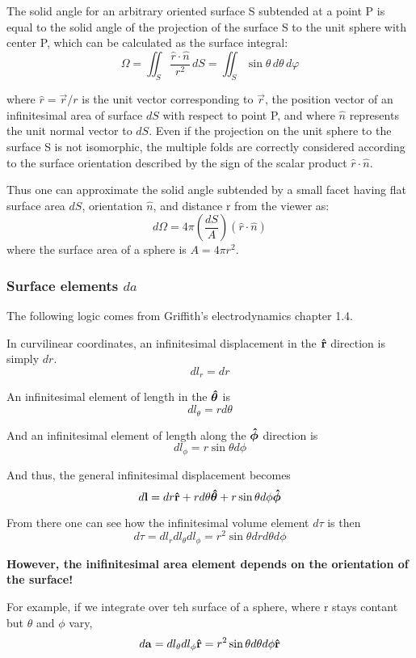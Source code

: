 The solid angle for an arbitrary oriented surface S subtended at a point P is equal to
the solid angle of the projection of the surface S to the unit sphere with center P,
which can be calculated as the surface integral:
$$
\Omega =\iint _{S} \frac{\hat{r}\cdot\hat{n}}{r^2} \,dS
= \iint_{S} \sin \theta \,d\theta \,d\varphi
$$

where $\hat{r} = \vec{r}/r$ is the unit vector corresponding to $\vec {r}$,
the position vector of an infinitesimal area of surface $dS$ with respect to point P,
and where $\hat{n}$ represents the unit normal vector to $dS$.
Even if the projection on the unit sphere to the surface S is not isomorphic,
the multiple folds are correctly considered according to the surface orientation
described by the sign of the scalar product $\hat{r}\cdot\hat{n}$.

Thus one can approximate the solid angle subtended by a small facet having flat surface area
$dS$, orientation $\hat{n}$, and distance r from the viewer as:
$$
d\Omega = 4\pi \left( \frac{dS}{A} \right) (\hat{r}\cdot\hat{n})
$$
where the surface area of a sphere is $A = 4\pi r^2$.


\subsubsection{Surface elements $da$}

The following logic comes from Griffith's electrodynamics chapter 1.4.

In curvilinear coordinates, an infinitesimal displacement in the $\boldsymbol{\mathbf{\hat{r}}}$ direction is
simply $dr$.
$$
dl_r = dr
$$

An infinitesimal element of length in the $\boldsymbol{\mathbf{\hat{\theta}}}$ is
$$
dl_\theta = r d\theta
$$

And an infinitesimal element of length along the $\boldsymbol{\mathbf{\hat{\phi}}}$ direction
is
$$
dl_\phi = r \sin\theta d\phi
$$

And thus, the general infinitesimal displacement becomes
$$
d\boldsymbol{\mathbf{l}} =
dr \boldsymbol{\mathbf{\hat{r}}}
+ r d\theta \boldsymbol{\mathbf{\hat{\theta}}}
+ r \sin\theta d\phi \boldsymbol{\mathbf{\hat{\phi}}}
$$

From there one can see how the infinitesimal volume element $d\tau$ is then
$$
d\tau = dl_r dl_\theta dl_\phi =
r^2 \sin\theta dr d\theta d\phi
$$

\textbf{However, the inifinitesimal area element depends on the orientation of the surface!}

For example, if we integrate over teh surface of a sphere, where r stays contant but $\theta$
and $\phi$ vary,
$$
d\boldsymbol{\mathbf{a}} = dl_\theta dl_\phi \boldsymbol{\mathbf{\hat{r}}} = r^2 \sin\theta d\theta d\phi \boldsymbol{\mathbf{\hat{r}}}
$$

